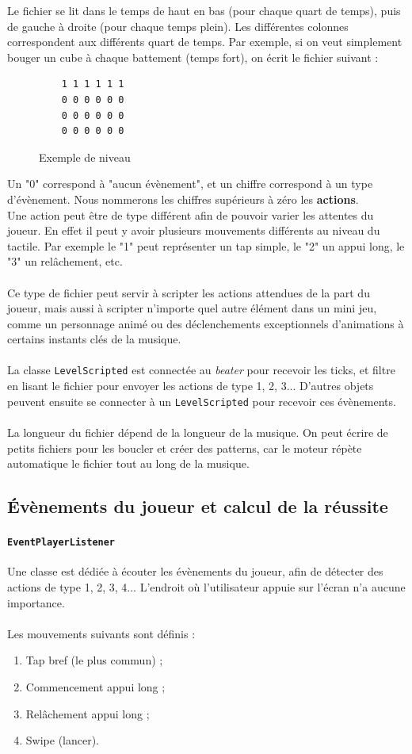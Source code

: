 Le fichier se lit dans le temps de haut en bas (pour chaque quart de temps), puis de gauche à droite (pour chaque temps plein). Les différentes colonnes correspondent aux différents quart de temps. Par exemple, si on veut simplement bouger un cube à chaque battement (temps fort), on écrit le fichier suivant :\\
\begin{figure}[!htb]
  \begin{lstlisting}
    1 1 1 1 1 1
    0 0 0 0 0 0
    0 0 0 0 0 0
    0 0 0 0 0 0
  \end{lstlisting}
\caption{Exemple de niveau}
\label{simple_level}
\end{figure}
Un "0" correspond à "aucun évènement", et un chiffre correspond à un type d'évènement. Nous nommerons les chiffres supérieurs à zéro les \textbf{actions}.
\\
Une action peut être de type différent afin de pouvoir varier les attentes du joueur. En effet il peut y avoir plusieurs mouvements différents au niveau du tactile. Par exemple le "1" peut représenter un tap simple, le "2" un appui long, le "3" un relâchement, etc.
\\\\
Ce type de fichier peut servir à scripter les actions attendues de la part du joueur, mais aussi à scripter n'importe quel autre élément dans un mini jeu, comme un personnage animé ou des déclenchements exceptionnels d'animations à certains instants clés de la musique.
\\\\
La classe \texttt{LevelScripted} est connectée au \textit{beater} pour recevoir les ticks, et filtre en lisant le fichier pour envoyer les actions de type 1, 2, 3... D'autres objets peuvent ensuite se connecter à un \texttt{LevelScripted} pour recevoir ces évènements.
\\\\
La longueur du fichier dépend de la longueur de la musique. On peut écrire de petits fichiers pour les boucler et créer des patterns, car le moteur répète automatique le fichier tout au long de la musique.

\subsection{Évènements du joueur et calcul de la réussite}
\paragraph{\texttt{EventPlayerListener}}
Une classe est dédiée à écouter les évènements du joueur, afin de détecter des actions de type 1, 2, 3, 4... L'endroit où l'utilisateur appuie sur l'écran n'a aucune importance.\\\\
Les mouvements suivants sont définis :
\begin{enumerate}
\item Tap bref (le plus commun) ;
\item Commencement appui long ;
\item Relâchement appui long ;
\item Swipe (lancer).
\end{enumerate}


